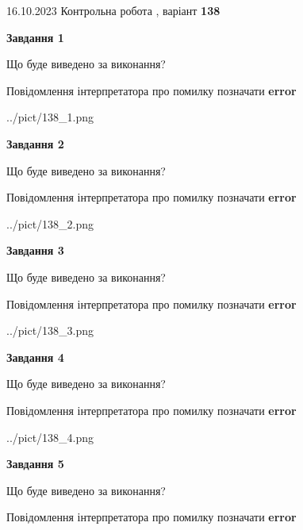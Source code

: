 \documentclass[12pt, ukrainian]{article}
\begin{document}
{\Large{16.10.2023 Контрольна робота , варіант  \No \textbf { 138 }\par}}
{
\begin {large}
{\begin {center}\textbf{Завдання 1}\end {center}}\par
Що буде виведено за виконання? \par
Повідомлення інтерпретатора про помилку позначати \textbf{error}

\begin{center}
	{../pict/138_1.png}
\end{center}
\newpage

{\begin {center}\textbf{Завдання 2}\end {center}}\par
Що буде виведено за виконання? \par
Повідомлення інтерпретатора про помилку позначати \textbf{error}

\begin{center}
	{../pict/138_2.png}
\end{center}
\newpage

{\begin {center}\textbf{Завдання 3}\end {center}}\par
Що буде виведено за виконання? \par
Повідомлення інтерпретатора про помилку позначати \textbf{error}

\begin{center}
	{../pict/138_3.png}
\end{center}
\newpage

{\begin {center}\textbf{Завдання 4}\end {center}}\par
Що буде виведено за виконання? \par
Повідомлення інтерпретатора про помилку позначати \textbf{error}

\begin{center}
	{../pict/138_4.png}
\end{center}
\newpage

{\begin {center}\textbf{Завдання 5}\end {center}}\par
Що буде виведено за виконання? \par
Повідомлення інтерпретатора про помилку позначати \textbf{error}


\end{large}}
\end{document}

